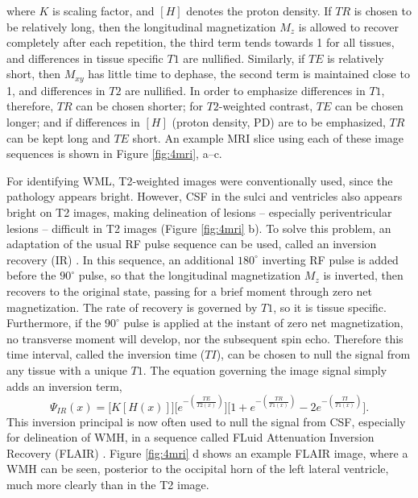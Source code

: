 where $K$ is scaling factor, and $\left[H\right]$ denotes the proton density. If $TR$ is chosen to be relatively long, then the longitudinal magnetization $M_z$ is allowed to recover completely after each repetition, the third term tends towards 1 for all tissues, and differences in tissue specific $T1$ are nullified. Similarly, if $TE$ is relatively short, then $M_{xy}$ has little time to dephase, the second term is maintained close to 1, and differences in $T2$ are nullified. In order to emphasize differences in $T1$, therefore, $TR$ can be chosen shorter; for $T2$-weighted contrast, $TE$ can be chosen longer; and if differences in $[H]$ (proton density, PD) are to be emphasized, $TR$ can be kept long and $TE$ short. An example MRI slice using each of these image sequences is shown in Figure \ref{fig:4mri}, a--c.
\par
For identifying WML, T2-weighted images were conventionally used, since the pathology appears bright. However, CSF in the sulci and ventricles also appears bright on T2 images, making delineation of lesions -- especially periventricular lesions -- difficult in T2 images (Figure \ref{fig:4mri} b). To solve this problem, an adaptation of the usual RF pulse sequence can be used, called an inversion recovery (IR) \cite{Bydder1985}. In this sequence, an additional $180^{\circ}$ inverting RF pulse is added before the $90^{\circ}$ pulse, so that the longitudinal magnetization $M_z$ is inverted, then recovers to the original state, passing for a brief moment through zero net magnetization. The rate of recovery is governed by $T1$, so it is tissue specific. Furthermore, if the $90^{\circ}$ pulse is applied at the instant of zero net magnetization, no transverse moment will develop, nor the subsequent spin echo. Therefore this time interval, called the inversion time ($TI$), can be chosen to null the signal from any tissue with a unique $T1$. The equation governing the image signal simply adds an inversion term,
\begin{equation}\label{eq:MRI-IR}
\Psi_{IR}(x) = \bigg[K \left[H(x)\right]\bigg]\bigg[e^{-\left(\frac{TE}{T2(x)}\right)}\bigg]\bigg[1 + e^{-\left(\frac{TR}{T1(x)}\right)} - 2e^{-\left(\frac{TI}{T1(x)}\right)}\bigg].
\end{equation}
This inversion principal is now often used to null the signal from CSF, especially for delineation of WMH, in a sequence called FLuid Attenuation Inversion Recovery (FLAIR) \cite{Hajnal1992}. Figure \ref{fig:4mri} d shows an example FLAIR image, where a WMH can be seen, posterior to the occipital horn of the left lateral ventricle, much more clearly than in the T2 image.
